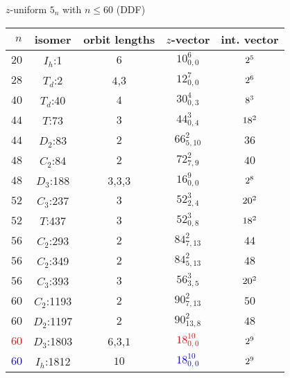 \documentclass[%
pdf,
colorBG,
slideColor,
]{prosper}
\begin{document}
\begin{slide}{$z$-uniform $5_n$ with $n\leq 60$ (DDF)}
\vspace{-7mm}
\begin{center}
{\tiny
\begin{tabular}{|c||c|c|c|c|}
\hline
$\,\,n$&isomer    &orbit lengths& $z$-vector    &  int. vector\\
\hline
$20$& $I_h$:1     &$6$         &$10_{0,0}^6$   &  $2\sp{5}$\\
$28$& $T_d$:2     &$4$,$3$     &$12_{0,0}^7$   &  $2\sp{6}$\\
$40$& $T_d$:40    &$4$         &$30_{0,3}^4$   &  $8\sp{3}$\\
$44$& $T$:73      &$3$         &$44_{0,4}^3$   &  $18\sp{2}$\\
$44$& $D_2$:83    &$2$         &$66_{5,10}^2$  &  $36$\\
$48$& $C_2$:84    &$2$         &$72_{7,9}^2$   &  $40$\\
$48$& $D_3$:188   &$3$,$3$,$3$ &$16_{0,0}^9$   &  $2\sp{8}$\\
$52$& $C_3$:237   &$3$         &$52_{2,4}^3$   &  $20\sp{2}$\\
$52$& $T$:437     &$3$         &$52_{0,8}^3$   &  $18\sp{2}$\\
$56$& $C_2$:293   &$2$         &$84_{7,13}^2$  &  $44$\\
$56$& $C_2$:349   &$2$         &$84_{5,13}^2$  &  $48$\\
$56$& $C_3$:393   &$3$         &$56_{3,5}^3$   &  $20\sp{2}$\\
$60$& $C_2$:1193  &$2$         &$90_{7,13}^2$  &  $50$\\
$60$& $D_2$:1197  &$2$         &$90_{13,8}^2$  &  $48$\\
\textcolor{red}{$60$}& $D_3$:1803  &$6$,$3$,$1$ &\textcolor{red}{$18_{0,0}^{10}$}&  \textcolor{red}{$2\sp{9}$}\\
\textcolor{blue}{$60$}& $I_h$:1812  &$10$        &\textcolor{blue}{$18_{0,0}^{10}$}&  \textcolor{blue}{$2\sp{9}$}\\
\hline
\end{tabular}
}
\end{center}



\end{slide}
\end{document}
